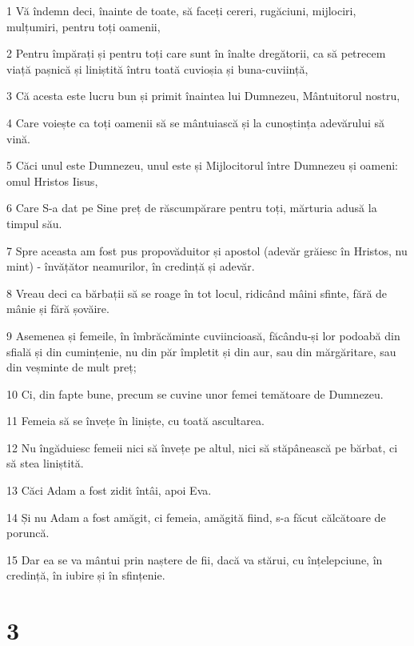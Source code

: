 \par 1 Vă îndemn deci, înainte de toate, să faceți cereri, rugăciuni, mijlociri, mulțumiri, pentru toți oamenii,
\par 2 Pentru împărați și pentru toți care sunt în înalte dregătorii, ca să petrecem viață pașnică și liniștită întru toată cuvioșia și buna-cuviință,
\par 3 Că acesta este lucru bun și primit înaintea lui Dumnezeu, Mântuitorul nostru,
\par 4 Care voiește ca toți oamenii să se mântuiască și la cunoștința adevărului să vină.
\par 5 Căci unul este Dumnezeu, unul este și Mijlocitorul între Dumnezeu și oameni: omul Hristos Iisus,
\par 6 Care S-a dat pe Sine preț de răscumpărare pentru toți, mărturia adusă la timpul său.
\par 7 Spre aceasta am fost pus propovăduitor și apostol (adevăr grăiesc în Hristos, nu mint) - învățător neamurilor, în credință și adevăr.
\par 8 Vreau deci ca bărbații să se roage în tot locul, ridicând mâini sfinte, fără de mânie și fără șovăire.
\par 9 Asemenea și femeile, în îmbrăcăminte cuviincioasă, făcându-și lor podoabă din sfială și din cumințenie, nu din păr împletit și din aur, sau din mărgăritare, sau din veșminte de mult preț;
\par 10 Ci, din fapte bune, precum se cuvine unor femei temătoare de Dumnezeu.
\par 11 Femeia să se învețe în liniște, cu toată ascultarea.
\par 12 Nu îngăduiesc femeii nici să învețe pe altul, nici să stăpânească pe bărbat, ci să stea liniștită.
\par 13 Căci Adam a fost zidit întâi, apoi Eva.
\par 14 Și nu Adam a fost amăgit, ci femeia, amăgită fiind, s-a făcut călcătoare de poruncă.
\par 15 Dar ea se va mântui prin naștere de fii, dacă va stărui, cu înțelepciune, în credință, în iubire și în sfințenie.

\chapter{3}

